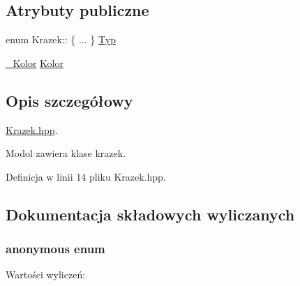 \subsection*{Atrybuty publiczne}
\begin{DoxyCompactItemize}
\item 
enum Krazek\-:: \{ ... \}  \hyperlink{class_krazek_a767fc805131233b1c024c2966a3e1812}{Typ}
\item 
\hyperlink{_punkt_8hpp_af66113a5c012c322e61ec5429f53c13c}{\-\_\-\-Kolor} \hyperlink{class_krazek_a5192365d6354046c4b2665c06a3bcfc3}{Kolor}
\end{DoxyCompactItemize}


\subsection{Opis szczegółowy}
\hyperlink{_krazek_8hpp}{Krazek.\-hpp}. 

Modol zawiera klase krazek. 

Definicja w linii 14 pliku Krazek.\-hpp.



\subsection{Dokumentacja składowych wyliczanych}
\hypertarget{class_krazek_a079112dabc156870b9f659aaf5a64191}{\subsubsection[{anonymous enum}]{\setlength{\rightskip}{0pt plus 5cm}anonymous enum}}\label{class_krazek_a079112dabc156870b9f659aaf5a64191}
\begin{Desc}
\item[Wartości wyliczeń\-: ]\par
\begin{description}
\item[{\em 
\hypertarget{class_krazek_a079112dabc156870b9f659aaf5a64191a874cd211d4bb55eb3d167abf13d36f22}{Z\-W\-Y\-K\-L\-Y}\label{class_krazek_a079112dabc156870b9f659aaf5a64191a874cd211d4bb55eb3d167abf13d36f22}
}]\item[{\em 
\hypertarget{class_krazek_a079112dabc156870b9f659aaf5a64191a00b8d47a0e1efc6faf59b4d14933d9da}{D\-A\-M\-K\-A}\label{class_krazek_a079112dabc156870b9f659aaf5a64191a00b8d47a0e1efc6faf59b4d14933d9da}
}]\end{description}
\end{Desc}



